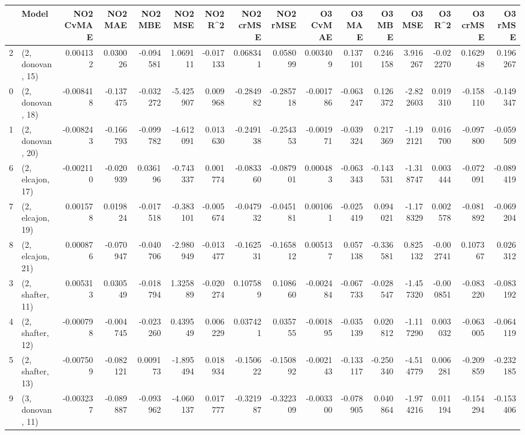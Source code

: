 \begin{tabular}{llrrrrrrrrrrrrrr}
\toprule
{} &             Model &  NO2 CvMAE &   NO2 MAE &   NO2 MBE &    NO2 MSE &   NO2 R\textasciicircum2 &  NO2 crMSE &  NO2 rMSE &  O3 CvMAE &    O3 MAE &    O3 MBE &     O3 MSE &    O3 R\textasciicircum2 &  O3 crMSE &   O3 rMSE \\
\midrule
2  &  (2, donovan, 15) &   0.004132 &  0.030026 & -0.094581 &   1.069111 & -0.017133 &   0.068341 &  0.058099 &  0.003409 &  0.137101 &  0.246158 &   3.916267 & -0.022270 &  0.162948 &  0.196267 \\
0  &  (2, donovan, 18) &  -0.008418 & -0.137475 & -0.032272 &  -5.425907 &  0.009968 &  -0.284982 & -0.285718 & -0.001786 & -0.063247 &  0.126372 &  -2.822603 &  0.019310 & -0.158110 & -0.149347 \\
1  &  (2, donovan, 20) &  -0.008243 & -0.166793 & -0.099782 &  -4.612091 &  0.013630 &  -0.249138 & -0.254353 & -0.001971 & -0.039324 &  0.217369 &  -1.192121 &  0.016700 & -0.097800 & -0.059509 \\
6  &  (2, elcajon, 17) &  -0.002110 & -0.020939 &  0.036196 &  -0.743337 &  0.001774 &  -0.083360 & -0.087901 &  0.000483 & -0.063343 & -0.143531 &  -1.318747 &  0.003444 & -0.072091 & -0.089419 \\
7  &  (2, elcajon, 19) &   0.001578 &  0.019824 & -0.017518 &  -0.383101 & -0.005674 &  -0.047932 & -0.045181 &  0.001061 & -0.025419 &  0.094021 &  -1.178329 &  0.002578 & -0.081892 & -0.069204 \\
8  &  (2, elcajon, 21) &   0.000876 & -0.070947 & -0.040706 &  -2.980949 & -0.013477 &  -0.162531 & -0.165812 &  0.005137 &  0.057138 & -0.336581 &   0.825132 & -0.002741 &  0.107367 &  0.026312 \\
3  &  (2, shafter, 11) &   0.005313 &  0.030549 & -0.018794 &   1.325889 & -0.020274 &   0.107589 &  0.108660 & -0.002484 & -0.067733 & -0.028547 &  -1.457320 & -0.000851 & -0.083220 & -0.083192 \\
4  &  (2, shafter, 12) &  -0.000798 & -0.004745 & -0.023260 &   0.439549 &  0.006229 &   0.037421 &  0.035755 & -0.001895 & -0.035139 &  0.020812 &  -1.117290 &  0.003032 & -0.063005 & -0.064119 \\
5  &  (2, shafter, 13) &  -0.007509 & -0.082121 &  0.009173 &  -1.895494 &  0.018934 &  -0.150622 & -0.150892 & -0.002143 & -0.133117 & -0.250340 &  -4.514779 &  0.006281 & -0.209859 & -0.232185 \\
9  &  (3, donovan, 11) &  -0.003237 & -0.089887 & -0.093962 &  -4.060137 &  0.017777 &  -0.321987 & -0.322309 & -0.003300 & -0.078905 &  0.040864 &  -1.974216 &  0.011194 & -0.154294 & -0.153406 \\

\end{tabular}
